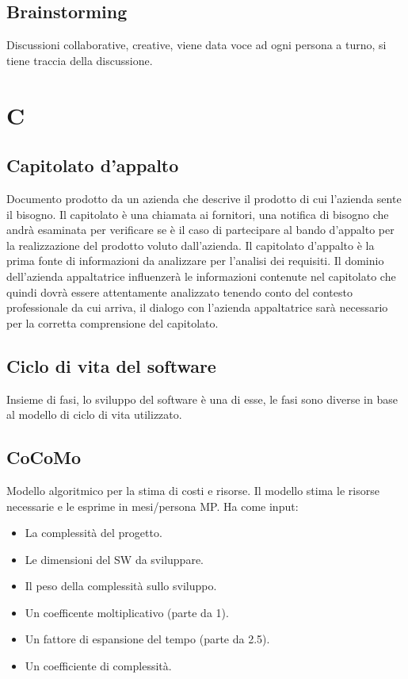 	\subsection{Brainstorming}
	\label{sec:brainstorming}
	Discussioni collaborative, creative, viene data voce ad ogni persona a turno, si tiene traccia della discussione. \newpage


	
	\section{C}

	\subsection{Capitolato d'appalto}
	\label{sec:capitolato}
	Documento prodotto da un azienda che descrive il prodotto di cui l'azienda sente il bisogno. Il capitolato è una chiamata ai fornitori, una notifica di bisogno che andrà esaminata per verificare se è il caso di partecipare al bando d'appalto per la realizzazione del prodotto voluto dall'azienda. Il capitolato d'appalto è la prima fonte di informazioni da analizzare per l'analisi dei requisiti. Il dominio dell'azienda appaltatrice influenzerà le informazioni contenute nel capitolato che quindi dovrà essere attentamente analizzato tenendo conto del contesto professionale da cui arriva, il dialogo con l'azienda appaltatrice sarà necessario per la corretta comprensione del capitolato. 
	
	\subsection{Ciclo di vita del software}
	\label{sec:ciclodivita}
	Insieme di fasi, lo sviluppo del software è una di esse, le fasi sono diverse in base al modello di ciclo di vita utilizzato.

	\subsection{CoCoMo}
	\label{sec:cocomo}
	Modello algoritmico per la stima di costi e risorse. Il modello stima le risorse necessarie e le esprime in mesi/persona MP. Ha come input:
	\begin{itemize}  
	\item La complessità del progetto.
	\item Le dimensioni del SW da sviluppare.
	\item Il peso della complessità sullo sviluppo.
	\item Un coefficente moltiplicativo (parte da 1).
	\item Un fattore di espansione del tempo (parte da 2.5).
	\item Un coefficiente di complessità. 
	\end{itemize}		

